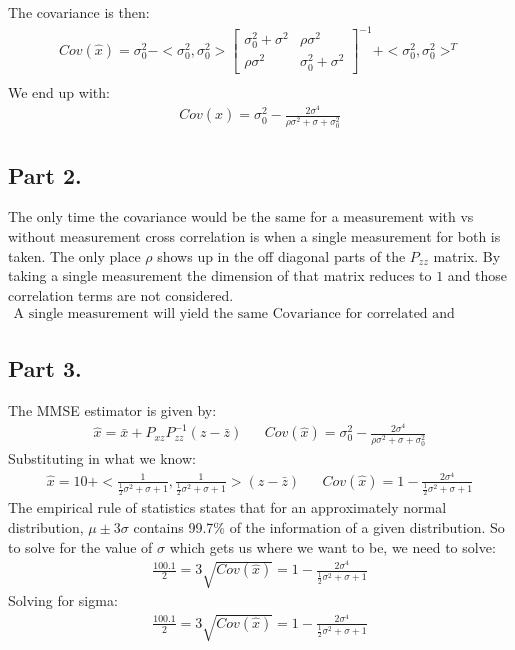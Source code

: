 \documentclass{article}
\begin{document}
The covariance is then:
\begin{align*}
Cov(\hat{x}) = \sigma^2_0 - <\sigma^2_0, \sigma^2_0> \begin{bmatrix}\sigma^2_0+ \sigma^2 & \rho \sigma^2 \\
          											\rho \sigma^2 & \sigma^2_0+ \sigma^2 \end{bmatrix} ^{-1} + <\sigma^2_0, \sigma^2_0>^T \\
\end{align*}
We end up with:
\begin{align*}
\boxed{ Cov(\hat{x}) = \sigma^2_0 - \frac{2\sigma^4}{\rho \sigma^2+\sigma+\sigma^2_0} }
\end{align*}
\subsection*{Part 2.}
The only time the covariance would be the same for a measurement with vs without measurement cross correlation is when a single measurement for both is taken. The only place $\rho$ shows up in the off diagonal parts of the $P_{zz}$ matrix. By taking a single measurement the dimension of that matrix reduces to $1$ and those correlation terms are not considered.
\begin{align*}
\boxed{ \text{A single measurement will yield the same Covariance for correlated and uncorrelated measurements.} } 
\end{align*}


\subsection*{Part 3.}
The MMSE estimator is given by:
\begin{align*}
\hat{x} = \bar{x} + P_{xz} P_{zz}^{-1} (z-\bar{z}) && Cov(\hat{x}) = \sigma^2_0 - \frac{2\sigma^4}{\rho \sigma^2+\sigma+\sigma^2_0}
\end{align*}
Substituting in what we know:
\begin{align*}
\hat{x} = 10 + <\frac{1}{\tfrac{1}{2}\sigma^2+\sigma+1},\frac{1}{\tfrac{1}{2}\sigma^2+\sigma+1}> (z-\bar{z}) && Cov(\hat{x}) = 1 - \frac{2\sigma^4}{\tfrac{1}{2}\sigma^2+\sigma+1}
\end{align*}
The empirical rule of statistics states that for an approximately normal distribution, $\mu \pm 3\sigma$ contains 99.7\% of the information of a given distribution. So to solve for the value of $\sigma$ which gets us where we want to be, we need to solve:
\begin{align*}
\frac{10 0.1}{2} = 3 \sqrt{ Cov(\hat{x}) } = 1 - \frac{2\sigma^4}{\tfrac{1}{2}\sigma^2+\sigma+1}
\end{align*}
Solving for sigma:
\begin{align*}
\frac{10 0.1}{2} = 3 \sqrt{ Cov(\hat{x}) } = 1 - \frac{2\sigma^4}{\tfrac{1}{2}\sigma^2+\sigma+1}
\end{align*}
\end{document}
